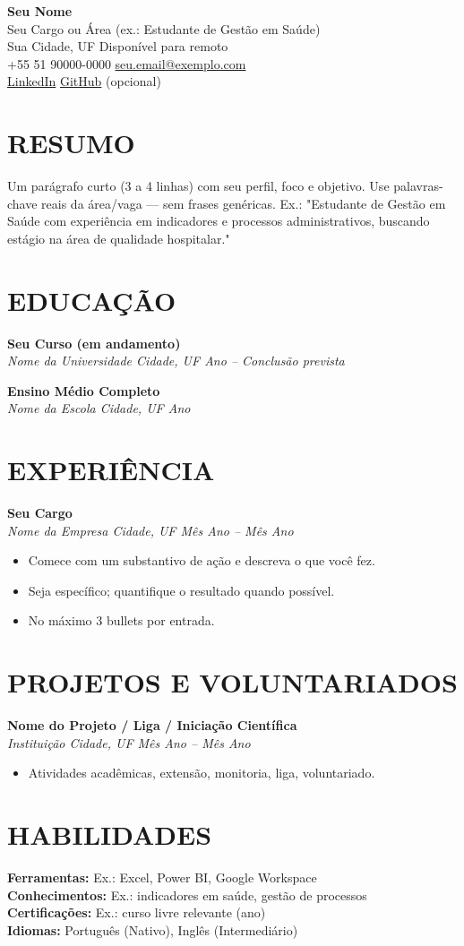\documentclass[a4paper,10pt]{article}
\newcommand{\entry}[2]{\noindent\textbf{#1}\\ \textit{#2}\par\vspace{0.15em}}
\begin{document}
{\Huge\textbf{Seu Nome}}\\[3pt]
{\large Seu Cargo ou Área (ex.: Estudante de Gestão em Saúde)}\\[3pt]
Sua Cidade, UF \textbullet{} Disponível para remoto\\
+55 51 90000-0000 \textbullet{} \href{mailto:seu.email@exemplo.com}{seu.email@exemplo.com}\\
\href{https://www.linkedin.com/in/seu-usuario}{LinkedIn} \textbullet{} \href{https://github.com/seu-usuario}{GitHub} (opcional)

\section{RESUMO}
Um parágrafo curto (3 a 4 linhas) com seu perfil, foco e objetivo. Use palavras-chave reais
da área/vaga — sem frases genéricas. Ex.: "Estudante de Gestão em Saúde com experiência em
indicadores e processos administrativos, buscando estágio na área de qualidade hospitalar."

\section{EDUCAÇÃO}
\entry{Seu Curso (em andamento)}{Nome da Universidade \textbullet{} Cidade, UF \textbullet{} Ano -- Conclusão prevista}
\entry{Ensino Médio Completo}{Nome da Escola \textbullet{} Cidade, UF \textbullet{} Ano}

\section{EXPERIÊNCIA}
\entry{Seu Cargo}{Nome da Empresa \textbullet{} Cidade, UF \textbullet{} Mês Ano -- Mês Ano}
\begin{itemize}
    \item Comece com um substantivo de ação e descreva o que você fez.
    \item Seja específico; quantifique o resultado quando possível.
    \item No máximo 3 bullets por entrada.
\end{itemize}

\section{PROJETOS E VOLUNTARIADOS}
\entry{Nome do Projeto / Liga / Iniciação Científica}{Instituição \textbullet{} Cidade, UF \textbullet{} Mês Ano -- Mês Ano}
\begin{itemize}
    \item Atividades acadêmicas, extensão, monitoria, liga, voluntariado.
\end{itemize}

\section{HABILIDADES}
\textbf{Ferramentas:} Ex.: Excel, Power BI, Google Workspace\\
\textbf{Conhecimentos:} Ex.: indicadores em saúde, gestão de processos\\
\textbf{Certificações:} Ex.: curso livre relevante (ano)\\
\textbf{Idiomas:} Português (Nativo), Inglês (Intermediário)
\end{document}
